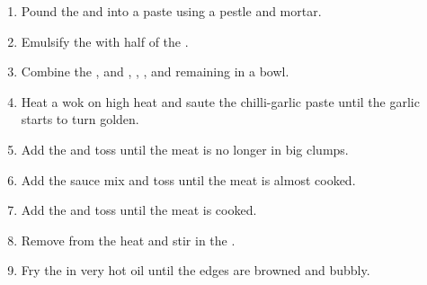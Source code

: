 \documentclass[12pt]{article}
\begin{document}
\begin{enumerate}
    \item Pound the  and  into a paste using a pestle and mortar.
    \item Emulsify the  with half of the .
    \item Combine the , and , , , and remaining  in a bowl.
    \item Heat a wok on high heat and saute the chilli-garlic paste until the garlic starts to turn golden.
    \item Add the  and toss until the meat is no longer in big clumps.
    \item Add the sauce mix and toss until the meat is almost cooked.
    \item Add the  and toss until the meat is cooked.
    \item Remove from the heat and stir in the .
    \item Fry the  in very hot oil until the edges are browned and bubbly.
\end{enumerate}
\end{document}
